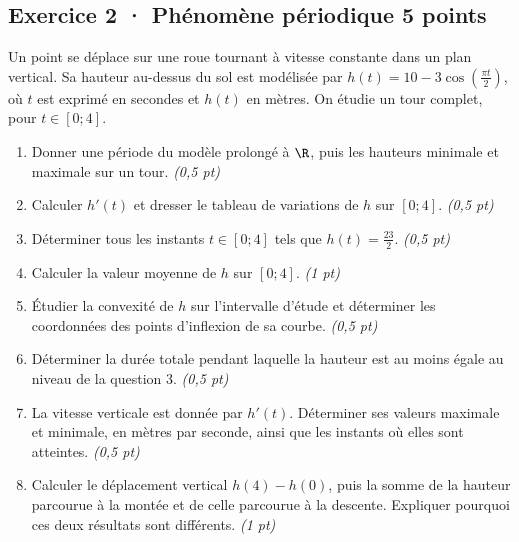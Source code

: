\subsection*{Exercice 2 · Phénomène périodique \hfill 5 points}Un point se déplace sur une roue tournant à vitesse constante dans un plan vertical. Sa hauteur au-dessus du sol est modélisée par $h(t)=10-3\cos\left(\frac{\pi t}{2}\right)$, où $t$ est exprimé en secondes et $h(t)$ en mètres. On étudie un tour complet, pour $t\in[0;4]$.

\begin{enumerate}

\item Donner une période du modèle prolongé à $\R$, puis les hauteurs minimale et maximale sur un tour. \hfill\textit{(0,5 pt)}

\item Calculer $h'(t)$ et dresser le tableau de variations de $h$ sur $[0;4]$. \hfill\textit{(0,5 pt)}

\item Déterminer tous les instants $t\in[0;4]$ tels que $h(t)=\frac{23}{2}$. \hfill\textit{(0,5 pt)}

\item Calculer la valeur moyenne de $h$ sur $[0;4]$. \hfill\textit{(1 pt)}

\item Étudier la convexité de $h$ sur l'intervalle d'étude et déterminer les coordonnées des points d'inflexion de sa courbe. \hfill\textit{(0,5 pt)}

\item Déterminer la durée totale pendant laquelle la hauteur est au moins égale au niveau de la question 3. \hfill\textit{(0,5 pt)}

\item La vitesse verticale est donnée par $h'(t)$. Déterminer ses valeurs maximale et minimale, en mètres par seconde, ainsi que les instants où elles sont atteintes. \hfill\textit{(0,5 pt)}

\item Calculer le déplacement vertical $h(4)-h(0)$, puis la somme de la hauteur parcourue à la montée et de celle parcourue à la descente. Expliquer pourquoi ces deux résultats sont différents. \hfill\textit{(1 pt)}

\end{enumerate}

\clearpage{}\par

